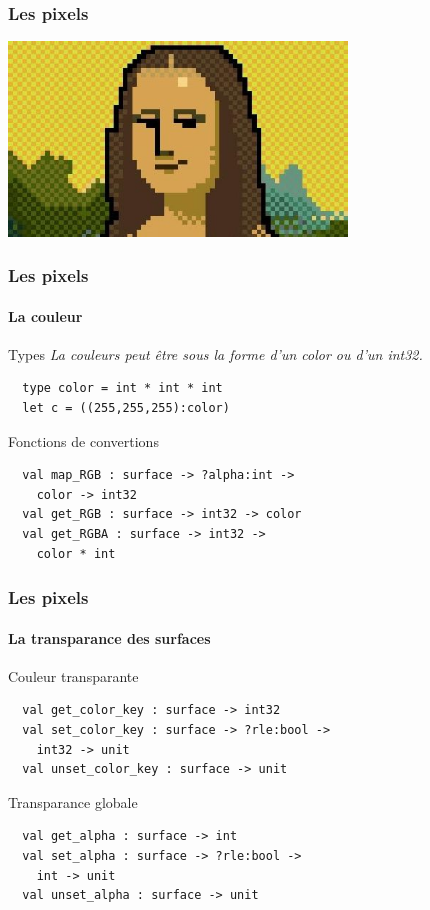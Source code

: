 \begin{frame}
	\frametitle{Les pixels}
	\begin{center}
		\includegraphics[width=9cm]{pics/Joconde-pixel.jpg}
	\end{center}
\end{frame}

\begin{frame}[fragile]
	\frametitle{Les pixels}
	\framesubtitle{La couleur}
	\begin{block}{Types}
		\textit{La couleurs peut être sous la forme d'un color ou d'un int32.}
		\begin{lstlisting}
  type color = int * int * int
  let c = ((255,255,255):color)
		\end{lstlisting}
	\end{block}
	\begin{block}{Fonctions de convertions}
		\begin{lstlisting}
  val map_RGB : surface -> ?alpha:int -> 
    color -> int32
  val get_RGB : surface -> int32 -> color
  val get_RGBA : surface -> int32 -> 
    color * int
		\end{lstlisting}
	\end{block}
\end{frame}

\begin{frame}[fragile]
	\frametitle{Les pixels}
	\framesubtitle{La transparance des surfaces}
	\begin{block}{Couleur transparante}
		\begin{lstlisting}
  val get_color_key : surface -> int32
  val set_color_key : surface -> ?rle:bool -> 
    int32 -> unit
  val unset_color_key : surface -> unit
		\end{lstlisting}
	\end{block}
	\begin{block}{Transparance globale}
		\begin{lstlisting}
  val get_alpha : surface -> int
  val set_alpha : surface -> ?rle:bool -> 
    int -> unit
  val unset_alpha : surface -> unit
		\end{lstlisting}
	\end{block}
\end{frame}

